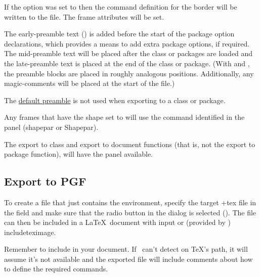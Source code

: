 If the  option was set to 
then the command definition for the border will be written to the
file. The frame attributes will be set.

The \gls{early-preamble} text () is added before the
start of the package option declarations, which provides a means to
add extra package options, if required.  The \gls{mid-preamble} text will
be placed after the class or packages are loaded and the
\gls{late-preamble} text is placed at the end of the class or package.
(With  and , the
preamble blocks are placed in roughly analogous positions.
Additionally, any \glspl{magic-comment} will be placed at the start
of the  file.)

\begin{important}
The \hyperref[sec:texconfigpreamble]{default preamble} is not used
when exporting to a class or package.
\end{important}


Any frames that have the shape set to
 will use the command identified
in the  panel (\gls{shapepar} or
\gls{Shapepar}).

The export to class and export to document functions (that is, not the
export to package function), will have the
 panel available.


\subsection{Export to PGF}\label{sec:exportpgf}


To create a file that just contains the  environment, 
specify the target \ext+{tex}
file in the  field and make sure that the
 radio button in the  dialog is selected
(). 
The file can then be included in a \LaTeX\ document with \gls{input}
or (provided by ) \gls{includeteximage}.

Remember to include  in your document. If
\FlowframTk\ can't detect  on \TeX's path, it
will assume it's not available and the exported file will include
comments about how to define the required commands.

